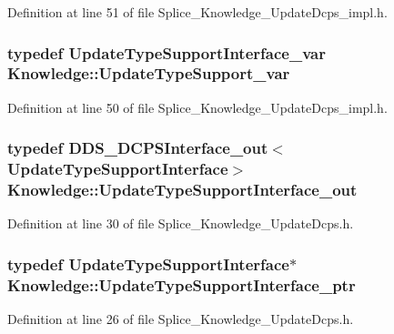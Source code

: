 Definition at line 51 of file Splice\_\-Knowledge\_\-UpdateDcps\_\-impl.h.

\hypertarget{namespaceKnowledge_a1f1a36d64a7bddcb9a53e10f9c6e2ac1}{
\subsubsection[{UpdateTypeSupport\_\-var}]{\setlength{\rightskip}{0pt plus 5cm}typedef {\bf UpdateTypeSupportInterface\_\-var} {\bf Knowledge::UpdateTypeSupport\_\-var}}}
\label{da/d50/namespaceKnowledge_a1f1a36d64a7bddcb9a53e10f9c6e2ac1}


Definition at line 50 of file Splice\_\-Knowledge\_\-UpdateDcps\_\-impl.h.

\hypertarget{namespaceKnowledge_ae6f2da65b9161a11f319e8520fa965c3}{
\subsubsection[{UpdateTypeSupportInterface\_\-out}]{\setlength{\rightskip}{0pt plus 5cm}typedef DDS\_\-DCPSInterface\_\-out$<$ {\bf UpdateTypeSupportInterface}$>$ {\bf Knowledge::UpdateTypeSupportInterface\_\-out}}}
\label{da/d50/namespaceKnowledge_ae6f2da65b9161a11f319e8520fa965c3}


Definition at line 30 of file Splice\_\-Knowledge\_\-UpdateDcps.h.

\hypertarget{namespaceKnowledge_a4e2a17714bd1ef8a9dac5ce745964659}{
\subsubsection[{UpdateTypeSupportInterface\_\-ptr}]{\setlength{\rightskip}{0pt plus 5cm}typedef {\bf UpdateTypeSupportInterface}$\ast$ {\bf Knowledge::UpdateTypeSupportInterface\_\-ptr}}}
\label{da/d50/namespaceKnowledge_a4e2a17714bd1ef8a9dac5ce745964659}


Definition at line 26 of file Splice\_\-Knowledge\_\-UpdateDcps.h.

